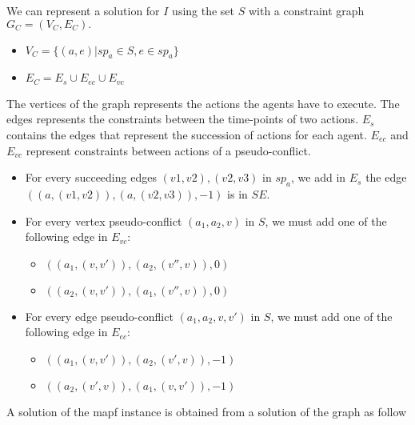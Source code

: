 We can represent a solution for $I$ using the set $S$ with a constraint graph $G_C=(V_C,E_C).$
\begin{itemize}
  \item $V_C = \{(a,e) | sp_a \in S, e \in sp_a \}$
  \item $E_C = E_s \cup E_{ec} \cup E_{vc}$
\end{itemize}
The vertices of the graph represents the actions the agents have to execute.
The edges represents the constraints between the time-points of two actions. $E_s$ contains the edges that represent the succession of actions for each agent. $E_{ec}$ and $E_{vc}$ represent constraints between actions of a pseudo-conflict.

\begin{itemize}
  \item For every succeeding edges $(v1,v2),(v2,v3)$ in $sp_a$, we add in $E_s$ the edge $((a,(v1,v2)),(a,(v2,v3)),-1)$ is in $SE$.
  \item For every vertex pseudo-conflict $(a_1,a_2,v)$ in $S$, we must add one of the following edge in $E_{vc}$:
  \begin{itemize}
    \item $((a_1,(v,v')),(a_2,(v'',v)),0)$
    \item $((a_2,(v,v')),(a_1,(v'',v)),0)$
  \end{itemize}
  \item For every edge pseudo-conflict $(a_1,a_2,v,v')$ in $S$, we must add one of the following edge in $E_{ec}$:
  \begin{itemize}
    \item $((a_1,(v,v')),(a_2,(v',v)),-1)$
    \item $((a_2,(v',v)),(a_1,(v,v')),-1)$
  \end{itemize}
\end{itemize}

A solution of the mapf instance is obtained from a solution of the graph as follow 
